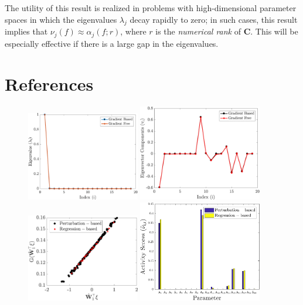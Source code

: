 \documentclass[1pt]{elsarticle}
\newcommand{\mat}[1]{\mathbf{{#1}}}
\begin{document}
The utility of this result is realized in 
problems with 
high-dimensional parameter spaces in which 
the eigenvalues $\lambda_j$ decay rapidly to zero; in 
such cases, this result implies that  $\nu_j(f) \approx \alpha_j(f; r)$,
where $r$ is the \emph{numerical rank} of $\mat{C}$.  This will be especially
effective if there is a large gap in the eigenvalues.  


\section*{References}



\begin{figure}[htbp]
 \begin{center}
  \includegraphics[width=0.44\textwidth]{./Figures/comp_eig}
\hspace{1mm}
  \includegraphics[width=0.48\textwidth]{./Figures/comp_eigv}
  \\ \vspace{5mm}
  \includegraphics[width=0.44\textwidth]{./Figures/comp_ssp}
\hspace{1mm}
  \includegraphics[width=0.48\textwidth]{./Figures/comp_as}
\end{center}
\end{figure}
\end{document}
